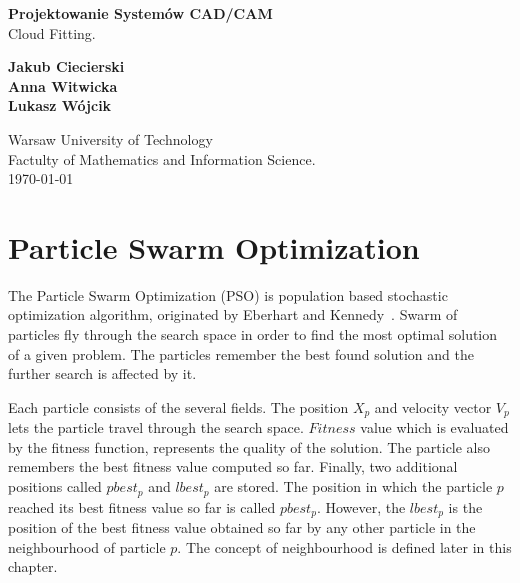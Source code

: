 \documentclass{book}
\author{Jakub Ciecierski}
\date{\today}
\begin{document}
\begin{titlepage}
    \begin{center}

            \textbf{\Huge Projektowanie Systemów CAD/CAM} \\ {\huge Cloud Fitting.} \\ [0.5cm]

            \vspace*{\fill}

            \textbf{\large Jakub Ciecierski \\ Anna Witwicka \\ Lukasz Wójcik}

            \vspace*{\fill}
            
            \textnormal{\large Warsaw University of Technology \\ Factulty of Mathematics and Information Science. \\ \today}

    \end{center}
\end{titlepage}

\tableofcontents


\chapter{Particle Swarm Optimization}\label{chap:pso}

The Particle Swarm Optimization (PSO) is population based stochastic optimization algorithm, originated by Eberhart and Kennedy~\cite{pso_origin}. Swarm of particles fly through the search space in order to find the most optimal solution of a given problem. The particles remember the best found solution and the further search is affected by it.

Each particle consists of the several fields. The position $X_p$ and velocity vector $V_p$ lets the particle travel through the search space. $Fitness$ value which is evaluated by the fitness function, represents the quality of the solution. The particle also remembers the best fitness value computed so far. Finally, two additional positions called $pbest_p$ and $lbest_p$ are stored. The position in which the particle $p$ reached its best fitness value so far is called $pbest_p$. However, the $lbest_p$ is the position of the best fitness value obtained so far by any other particle in the neighbourhood of particle $p$. The concept of neighbourhood is defined later in this chapter.
\end{document}
